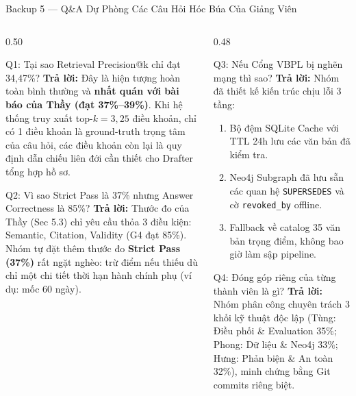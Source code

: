 \documentclass[aspectratio=169,10pt,xcolor={table}]{beamer}
\begin{document}
\begin{frame}{Backup 5 --- Q\&A Dự Phòng Các Câu Hỏi Hóc Búa Của Giảng Viên}
\footnotesize
\begin{columns}[T]
\begin{column}{0.50\textwidth}
\begin{block}{\small Q1: Tại sao Retrieval Precision@k chỉ đạt 34,47\%?}
\scriptsize
\textbf{Trả lời:} Đây là hiện tượng hoàn toàn bình thường và \textbf{nhất quán với bài báo của Thầy (đạt 37\%--39\%)}. Khi hệ thống truy xuất top-$k=3{,}25$ điều khoản, chỉ có 1 điều khoản là ground-truth trọng tâm của câu hỏi, các điều khoản còn lại là quy định dẫn chiếu liên đới cần thiết cho Drafter tổng hợp hồ sơ.
\end{block}
\begin{block}{\small Q2: Vì sao Strict Pass là 37\% nhưng Answer Correctness là 85\%?}
\scriptsize
\textbf{Trả lời:} Thước đo của Thầy (Sec 5.3) chỉ yêu cầu thỏa 3 điều kiện: Semantic, Citation, Validity (G4 đạt 85\%). Nhóm tự đặt thêm thước đo \textbf{Strict Pass (37\%)} rất ngặt nghèo: trừ điểm nếu thiếu dù chỉ một chi tiết thời hạn hành chính phụ (ví dụ: mốc 60 ngày).
\end{block}
\end{column}

\begin{column}{0.48\textwidth}
\begin{block}{\small Q3: Nếu Cổng VBPL bị nghẽn mạng thì sao?}
\scriptsize
\textbf{Trả lời:} Nhóm đã thiết kế kiến trúc chịu lỗi 3 tầng:
\begin{enumerate}\tiny
  \item Bộ đệm SQLite Cache với TTL 24h lưu các văn bản đã kiểm tra.
  \item Neo4j Subgraph đã lưu sẵn các quan hệ \texttt{SUPERSEDES} và cờ \texttt{revoked\_by} offline.
  \item Fallback về catalog 35 văn bản trọng điểm, không bao giờ làm sập pipeline.
\end{enumerate}
\end{block}
\begin{block}{\small Q4: Đóng góp riêng của từng thành viên là gì?}
\scriptsize
\textbf{Trả lời:} Nhóm phân công chuyên trách 3 khối kỹ thuật độc lập (Tùng: Điều phối \& Evaluation 35\%; Phong: Dữ liệu \& Neo4j 33\%; Hưng: Phản biện \& An toàn 32\%), minh chứng bằng Git commits riêng biệt.
\end{block}
\end{column}
\end{columns}
\end{frame}
\end{document}
